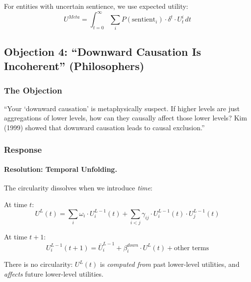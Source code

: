 For entities with uncertain sentience, we use expected utility:
\begin{equation}
U^{Meta} = \int_{t=0}^{\infty} \sum_{i} P(\text{sentient}_i) \cdot \delta^t \cdot U^i_t \, dt
\end{equation}

\subsection{Objection 4: ``Downward Causation Is Incoherent'' (Philosophers)}

\subsubsection{The Objection}

\begin{tcolorbox}[colback=red!5!white, colframe=red!75!black, title=Philosopher's Objection]
``Your `downward causation' is metaphysically suspect. If higher levels are 
just aggregations of lower levels, how can they causally affect those lower 
levels? Kim (1999) showed that downward causation leads to causal exclusion.''
\end{tcolorbox}

\subsubsection{Response}

\paragraph{Resolution: Temporal Unfolding.}

The circularity dissolves when we introduce \textit{time}:

At time $t$:
\begin{equation}
U^L(t) = \sum_i \omega_i \cdot U^{L-1}_i(t) + \sum_{i<j} \gamma_{ij} \cdot U^{L-1}_i(t) \cdot U^{L-1}_j(t)
\end{equation}

At time $t+1$:
\begin{equation}
U^{L-1}_i(t+1) = \bar{U}^{L-1}_i + \beta^{down}_i \cdot U^L(t) + \text{other terms}
\end{equation}

There is no circularity: $U^L(t)$ is \textit{computed from} past lower-level 
utilities, and \textit{affects} future lower-level utilities.

